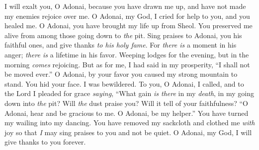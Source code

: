 \begin{biblechapter} %
 I will exalt you, O Adonai, 
because you have drawn me up, 
and have not made my enemies rejoice over me.
\verse O Adonai, my God, 
I cried for help to you, 
and you healed me.
\verse O Adonai, you have brought my life up from Sheol. 
You preserved me alive 
from among those going down  to \textit{the} pit.
\verse Sing praises to Adonai, you his faithful ones, 
and give thanks \textit{to his holy fame}.
\verse For \textit{there is} a moment in his anger; 
\textit{there is} a lifetime in his favor. 
Weeping lodges for the evening, 
but in the morning \textit{comes} rejoicing.
\verse But as for me, I had said in my prosperity, 
“I shall not be moved ever.”
\verse O Adonai, by your favor 
you caused my strong mountain to stand. 
You hid your face. I was bewildered.
\verse To you, O Adonai, I called, 
and to the Lord I pleaded for grace \textit{saying},
\verse “What gain \textit{is there} in my \textit{death}, 
in my going down into \textit{the} pit? 
Will \textit{the} dust praise you? 
Will it tell of your faithfulness?
\verse “O Adonai, hear and be gracious to me. 
O Adonai, be my helper.”
\verse You have turned my wailing into my dancing. 
You have removed my sackcloth 
and clothed me \textit{with} joy
\verse so that \textit{I} may sing praises to you 
and not be quiet. 
O Adonai, my God, 
I will give thanks to you forever.
\end{biblechapter}

